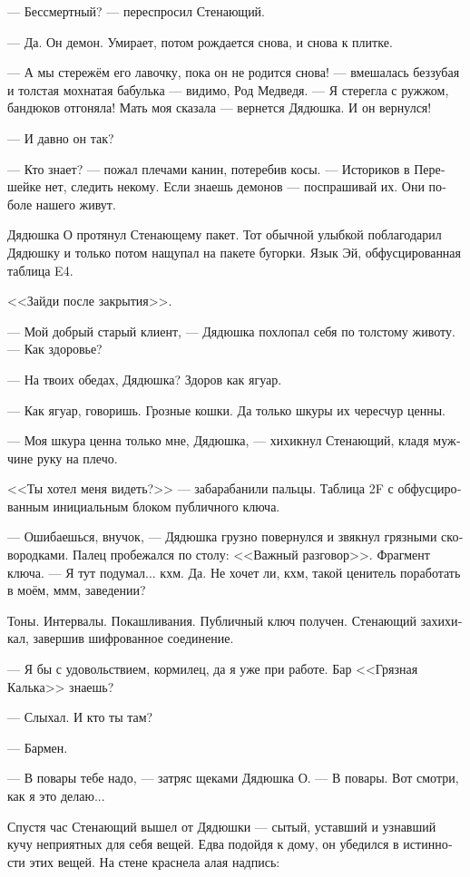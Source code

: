 \documentclass[a4paper,12pt,fleqn]{book}\usepackage{cooltooltips}\usepackage{polyglossia}\setdefaultlanguage[babelshorthands=true]{russian}\setotherlanguage{english}\defaultfontfeatures{Ligatures=TeX,Mapping=tex-text} \usepackage{xcolor}\definecolor{lightgray}{HTML}{bbbbbb}\color{lightgray}\newcommand{\ml}[3]{\textenglish{\textcolor{black}{#3}}}
\newcommand{\asterism}{\vspace{1em}{\centering\Large\bfseries$\ast~\ast~\ast$\par}\vspace{1em}}
\begin{document}
--- Бессмертный? --- переспросил Стенающий.

--- Да.
Он демон.
Умирает, потом рождается снова, и снова к плитке.

--- А мы стережём его лавочку, пока он не родится снова! --- вмешалась беззубая и толстая мохнатая бабулька --- видимо, Род Медведя.
--- Я стерегла с ружжом, бандюков отгоняла!
Мать моя сказала --- вернется Дядюшка.
И он вернулся!

--- И давно он так?

--- Кто знает? --- пожал плечами канин, потеребив косы.
--- Историков в Перешейке нет, следить некому.
Если знаешь демонов --- поспрашивай их.
Они поболе нашего живут.

\asterism

Дядюшка О протянул Стенающему пакет.
Тот обычной улыбкой поблагодарил Дядюшку и только потом нащупал на пакете бугорки.
Язык Эй, обфусцированная таблица E4.

<<Зайди после закрытия>>.

\asterism

--- Мой добрый старый клиент, --- Дядюшка похлопал себя по толстому животу.
--- Как здоровье?

--- На твоих обедах, Дядюшка?
Здоров как ягуар.

--- Как ягуар, говоришь.
Грозные кошки.
Да только шкуры их чересчур ценны.

--- Моя шкура ценна только мне, Дядюшка, --- хихикнул Стенающий, кладя мужчине руку на плечо.

<<Ты хотел меня видеть?>> --- забарабанили пальцы.
Таблица 2F с обфусцированным инициальным блоком публичного ключа.

--- Ошибаешься, внучок, --- Дядюшка грузно повернулся и звякнул грязными сковородками.
Палец пробежался по столу: <<Важный разговор>>.
Фрагмент ключа.
--- Я тут подумал... кхм.
Да.
Не хочет ли, кхм, такой ценитель поработать в моём, ммм, заведении?

Тоны.
Интервалы.
Покашливания.
Публичный ключ получен.
Стенающий захихикал, завершив шифрованное соединение.

--- Я бы с удовольствием, кормилец, да я уже при работе.
Бар <<Грязная Калька>> знаешь?

--- Слыхал.
И кто ты там?

--- Бармен.

--- В повары тебе надо, --- затряс щеками Дядюшка О.
--- В повары.
Вот смотри, как я это делаю...

Спустя час Стенающий вышел от Дядюшки --- сытый, уставший и узнавший кучу неприятных для себя вещей.
Едва подойдя к дому, он убедился в истинности этих вещей.
На стене краснела алая надпись:
\end{document}
